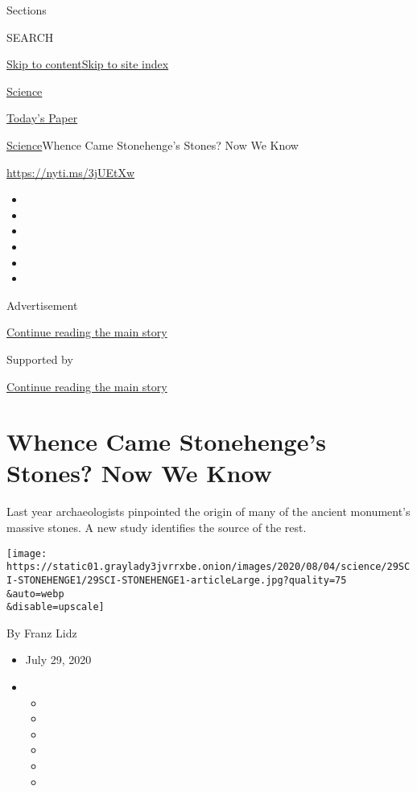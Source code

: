 Sections

SEARCH

\protect\hyperlink{site-content}{Skip to
content}\protect\hyperlink{site-index}{Skip to site index}

\href{https://www.nytimes3xbfgragh.onion/section/science}{Science}

\href{https://myaccount.nytimes3xbfgragh.onion/auth/login?response_type=cookie\&client_id=vi}{}

\href{https://www.nytimes3xbfgragh.onion/section/todayspaper}{Today's
Paper}

\href{/section/science}{Science}\textbar{}Whence Came Stonehenge's
Stones? Now We Know

\url{https://nyti.ms/3jUEtXw}

\begin{itemize}
\item
\item
\item
\item
\item
\item
\end{itemize}

Advertisement

\protect\hyperlink{after-top}{Continue reading the main story}

Supported by

\protect\hyperlink{after-sponsor}{Continue reading the main story}

\hypertarget{whence-came-stonehenges-stones-now-we-know}{%
\section{Whence Came Stonehenge's Stones? Now We
Know}\label{whence-came-stonehenges-stones-now-we-know}}

Last year archaeologists pinpointed the origin of many of the ancient
monument's massive stones. A new study identifies the source of the
rest.

\texttt{[image: https://static01.graylady3jvrrxbe.onion/images/2020/08/04/science/29SCI-STONEHENGE1/29SCI-STONEHENGE1-articleLarge.jpg?quality=75\\\&auto=webp\\\&disable=upscale]}

By Franz Lidz

\begin{itemize}
\item
  July 29, 2020
\item
  \begin{itemize}
  \item
  \item
  \item
  \item
  \item
  \item
  \end{itemize}
\end{itemize}

